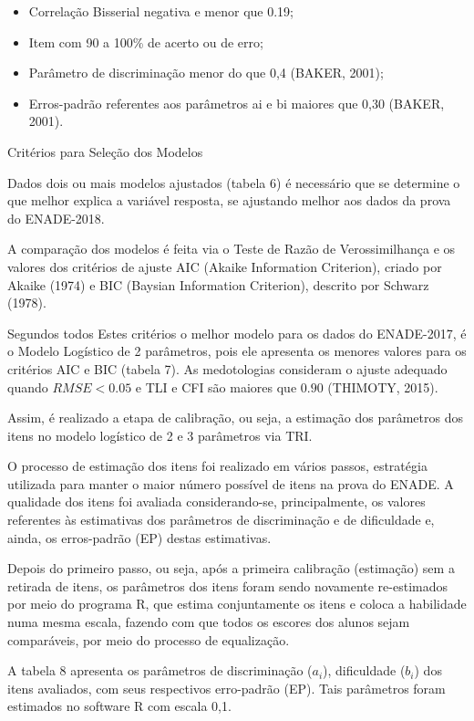 \documentclass[12pt]{article}
\begin{document}
\begin{itemize}
\item Correlação Bisserial negativa e menor que 0.19;
\item Item com 90 a 100\% de acerto ou de erro;
\item Parâmetro de discriminação menor do que 0,4 (BAKER, 2001);
\item Erros-padrão referentes aos parâmetros ai e bi maiores que 0,30 (BAKER, 2001).
\end{itemize}

Critérios para Seleção dos Modelos

Dados dois ou mais modelos ajustados (tabela 6) é necessário que se determine o que melhor explica a variável resposta, se ajustando melhor aos dados da prova do ENADE-2018.

A comparação dos modelos é feita via o Teste de Razão de Verossimilhança e os valores dos critérios de ajuste AIC (Akaike Information Criterion), criado por Akaike (1974) e BIC (Baysian Information Criterion), descrito por Schwarz (1978). 



Segundos todos Estes critérios o melhor modelo para os dados do ENADE-2017, é o Modelo Logístico de 2 parâmetros, pois ele apresenta os menores valores para os critérios AIC e BIC (tabela 7). As medotologias consideram o ajuste adequado quando $RMSE < 0.05$ e TLI e CFI são maiores que $0.90$ (THIMOTY, 2015).





Assim, é realizado a etapa de calibração, ou seja, a estimação dos parâmetros dos itens no modelo logístico de 2 e 3 parâmetros via TRI. 

O processo de estimação dos itens foi realizado em vários passos, estratégia utilizada para manter o maior número possível de itens na prova do ENADE. A qualidade dos itens foi avaliada considerando-se, principalmente, os valores referentes às estimativas dos parâmetros de discriminação e de dificuldade e, ainda, os erros-padrão (EP) destas estimativas.

Depois do primeiro passo, ou seja, após a primeira calibração (estimação) sem a retirada de itens, os parâmetros dos itens foram sendo novamente re-estimados por meio do programa R, que estima conjuntamente os itens e coloca a habilidade numa mesma escala, fazendo com que todos os escores dos alunos sejam comparáveis, por meio do processo de equalização.

A tabela 8 apresenta os parâmetros de discriminação ($a_{i}$), dificuldade ($b_{i}$) dos itens avaliados, com seus respectivos erro-padrão (EP). Tais parâmetros foram estimados no software R com escala 0,1.
\end{document}
